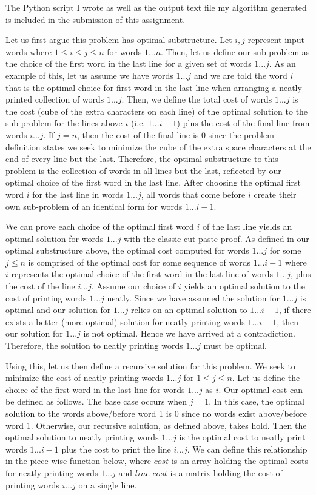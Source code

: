 \documentclass[11pt]{article}
\begin{document}
The Python script I wrote as well as the output text file my algorithm generated is included in the submission of this assignment.

Let us first argue this problem has optimal substructure. Let $i,j$ represent input words where $1 \leq i \leq j \leq n$ for words $1...n$. Then, let us define our sub-problem as the choice of the first word in the last line for a given set of words $1...j$. As an example of this, let us assume we have words $1...j$ and we are told the word $i$ that is the optimal choice for first word in the last line when arranging a neatly printed collection of words $1...j$. Then, we define the total cost of words $1...j$ is the cost (cube of the extra characters on each line) of the optimal solution to the sub-problem for the lines above $i$ (i.e. $1...i-1$) plus the cost of the final line from words $i...j$. If $j = n$, then the cost of the final line is 0 since the problem definition states we seek to minimize the cube of the extra space characters at the end of every line but the last. Therefore, the optimal substructure to this problem is the collection of words in all lines but the last, reflected by our optimal choice of the first word in the last line. After choosing the optimal first word $i$ for the last line in words $1...j$, all words that come before $i$ create their own sub-problem of an identical form for words $1...i-1$.

We can prove each choice of the optimal first word $i$ of the last line yields an optimal solution for words $1...j$ with the classic cut-paste proof. As defined in our optimal substructure above, the optimal cost computed for words $1...j$ for some $j \leq n$ is comprised of the optimal cost for some sequence of words $1...i-1$ where $i$ represents the optimal choice of the first word in the last line of words $1...j$, plus the cost of the line $i...j$. Assume our choice of $i$ yields an optimal solution to the cost of printing words $1...j$ neatly. Since we have assumed the solution for $1...j$ is optimal and our solution for $1...j$ relies on an optimal solution to $1...i-1$, if there exists a better (more optimal) solution for neatly printing words $1...i-1$, then our solution for $1...j$ is not optimal. Hence we have arrived at a contradiction. Therefore, the solution to neatly printing words $1...j$ must be optimal.

Using this, let us then define a recursive solution for this problem. We seek to minimize the cost of neatly printing words $1...j$ for $1 \leq j \leq n$. Let us define the choice of the first word in the last line for words $1...j$ as $i$. Our optimal cost can be defined as follows. The base case occurs when $j=1$. In this case, the optimal solution to the words above/before word 1 is 0 since no words exist above/before word 1. Otherwise, our recursive solution, as defined above, takes hold. Then the optimal solution to neatly printing words $1...j$ is the optimal cost to neatly print words $1...i-1$ plus the cost to print the line $i...j$. We can define this relationship in the piece-wise function below, where $cost$ is an array holding the optimal costs for neatly printing words $1...j$ and $line\_cost$ is a matrix holding the cost of printing words $i...j$ on a single line.
\end{document}
